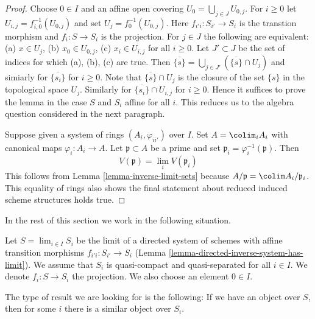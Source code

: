 \begin{proof}
Choose $0 \in I$ and an affine open covering
$U_0 = \bigcup_{j \in J} U_{0, j}$.
For $i \geq 0$ let $U_{i, j} = f_{i, 0}^{-1}(U_{0, j})$
and set $U_j = f_0^{-1}(U_{0, j})$.
Here $f_{i'i} : S_{i'} \to S_i$ is the transtion morphism
and $f_i : S \to S_i$ is the projection.
For $j \in J$ the following are equivalent:
(a) $x \in U_j$, (b) $x_0 \in U_{0, j}$,
(c) $x_i \in U_{i, j}$ for all $i \geq 0$.
Let $J' \subset J$ be the set of indices for which (a), (b), (c) are true.
Then $\overline{\{s\}} = \bigcup_{j \in J'} (\overline{\{s\}} \cap U_j)$
and simiarly for $\overline{\{s_i\}}$ for $i \geq 0$.
Note that $\overline{\{s\}} \cap U_j$ is the closure of the
set $\{s\}$ in the topological space $U_j$. Similarly for
$\overline{\{s_i\}} \cap U_{i, j}$ for $i \geq 0$.
Hence it suffices to prove the lemma in the case
$S$ and $S_i$ affine for all $i$. This reduces us to the
algebra question considered in the next paragraph.

\medskip\noindent
Suppose given a system of rings $(A_i, \varphi_{ii'})$
over $I$. Set $A = \colim_i A_i$ with canonical maps
$\varphi_i : A_i \to A$. Let $\mathfrak p \subset A$ be a
prime and set $\mathfrak p_i = \varphi_i^{-1}(\mathfrak p)$.
Then
$$
V(\mathfrak p) = \lim_i V(\mathfrak p_i)
$$
This follows from Lemma \ref{lemma-inverse-limit-sets}
because $A/\mathfrak p = \colim A_i/\mathfrak p_i$.
This equality of rings also shows the final statement
about reduced induced scheme structures holds true.
\end{proof}

\noindent
In the rest of this section we work in the following situation.

\begin{situation}
\label{situation-descent}
Let $S = \lim_{i \in I} S_i$ be the limit of a directed system of schemes
with affine transition morphisms $f_{i'i} : S_{i'} \to S_i$
(Lemma \ref{lemma-directed-inverse-system-has-limit}).
We assume that $S_i$ is quasi-compact and quasi-separated for all $i \in I$.
We denote $f_i : S \to S_i$ the projection.
We also choose an element $0 \in I$.
\end{situation}

\noindent
The type of result we are looking for is the following:
If we have an object over $S$, then for some $i$ there is a
similar object over $S_i$.

